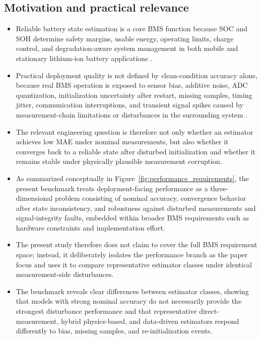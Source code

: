 \documentclass[review,nopreprintline]{elsarticle}
\begin{document}
\subsection{Motivation and practical relevance}
\begin{itemize}[leftmargin=*]
    \item Reliable battery state estimation is a core BMS function because SOC and SOH determine safety margins, usable energy, operating limits, charge control, and degradation-aware system management in both mobile and stationary lithium-ion battery applications \cite{shrivastavaReviewTechnologicalAdvancement2023,guoSystematicReviewElectrochemical2024,yaoSmarterBatteryManagement2025b}.
    \item Practical deployment quality is not defined by clean-condition accuracy alone, because real BMS operation is exposed to sensor bias, additive noise, ADC quantization, initialization uncertainty after restart, missing samples, timing jitter, communication interruptions, and transient signal spikes caused by measurement-chain limitations or disturbances in the surrounding system \cite{liRobustnessSOCEstimation2015,naseriReliableWirelessBMS2025,bergerBenchmarkingBatteryManagement2024}.
    \item The relevant engineering question is therefore not only whether an estimator achieves low MAE under nominal measurements, but also whether it converges back to a reliable state after disturbed initialization and whether it remains stable under physically plausible measurement corruption.
    \item As summarized conceptually in Figure~\ref{fig:performance_requirements}, the present benchmark treats deployment-facing performance as a three-dimensional problem consisting of nominal accuracy, convergence behavior after state inconsistency, and robustness against disturbed measurements and signal-integrity faults, embedded within broader BMS requirements such as hardware constraints and implementation effort.
    \item The present study therefore does not claim to cover the full BMS requirement space; instead, it deliberately isolates the performance branch as the paper focus and uses it to compare representative estimator classes under identical measurement-side disturbances.
    \item The benchmark reveals clear differences between estimator classes, showing that models with strong nominal accuracy do not necessarily provide the strongest disturbance performance and that representative direct-measurement, hybrid physics-based, and data-driven estimators respond differently to bias, missing samples, and re-initialization events.
\end{itemize}
\end{document}
